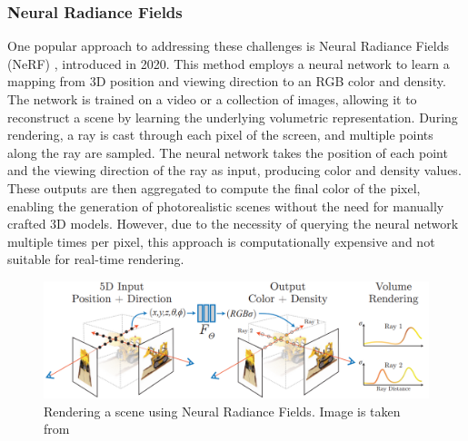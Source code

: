 \documentclass[12pt]{article}
\begin{document}
\subsubsection{Neural Radiance Fields}
One popular approach to addressing these challenges is Neural Radiance Fields (NeRF) \parencite{Nerf}, introduced in 2020. This method employs a neural network to learn a mapping from 3D position and viewing direction to an RGB color and density. The network is trained on a video or a collection of images, allowing it to reconstruct a scene by learning the underlying volumetric representation. During rendering, a ray is cast through each pixel of the screen, and multiple points along the ray are sampled. The neural network takes the position of each point and the viewing direction of the ray as input, producing color and density values. These outputs are then aggregated to compute the final color of the pixel, enabling the generation of photorealistic scenes without the need for manually crafted 3D models. However, due to the necessity of querying the neural network multiple times per pixel, this approach is computationally expensive and not suitable for real-time rendering.
\begin{figure}[h!]
	\centering
	\includegraphics[width=\textwidth]{Images/Nerf.png}
	\caption{Rendering a scene using Neural Radiance Fields. Image is taken from \cite{Nerf}}
	\label{fig:nerf}
\end{figure}
\end{document}
